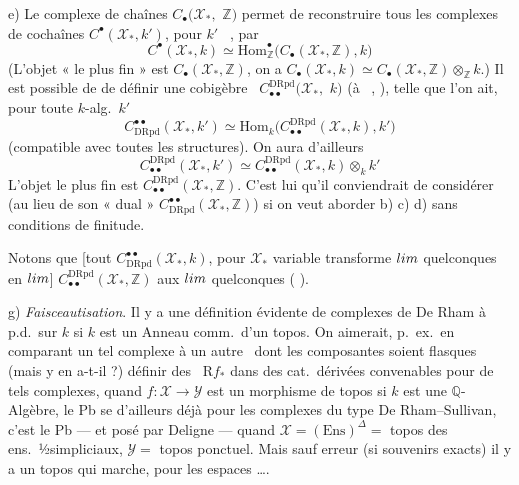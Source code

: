 \documentclass[11pt,a4paper]{article}
\begin{document}
e) Le complexe de chaînes $C_\bullet(\mathcal{X}_*,$  $\mathbb{Z})$ permet de reconstruire tous les complexes de cochaînes $C^\bullet(\mathcal{X}_*, k')$, pour $k'$ \struck{\ill{}} \ , par
\[ C^\bullet(\mathcal{X}_*, k) \simeq \mathrm{Hom}^\bullet_{\mathbb{Z}}\bigl(C_\bullet(\mathcal{X}_*, \mathbb{Z}), k\bigr) \]
(L'objet « le plus fin » est $C_\bullet(\mathcal{X}_*, \mathbb{Z})$, on a $C_\bullet(\mathcal{X}_*, k) \simeq C_\bullet(\mathcal{X}_*, \mathbb{Z}) \otimes_{\mathbb{Z}} k$.) Il est possible de \struck{\ill{}} de définir une cobigèbre \ $C^{\mathrm{DRpd}}_{\bullet\bullet}(\mathcal{X}_*,$  $k)$ (à \ , ), telle que l'on ait, pour toute $k$-alg.\ $k'$
\[ C^{\bullet\bullet}_{\mathrm{DRpd}}(\mathcal{X}_*, k') \simeq \mathrm{Hom}_k\bigl(C^{\mathrm{DRpd}}_{\bullet\bullet}(\mathcal{X}_*, k), k'\bigr) \]
(compatible avec toutes les structures). On aura d'ailleurs
\[ C^{\mathrm{DRpd}}_{\bullet\bullet}(\mathcal{X}_*, k') \simeq C^{\mathrm{DRpd}}_{\bullet\bullet}(\mathcal{X}_*, k) \otimes_k k' \]
L'objet le plus fin est $C^{\mathrm{DRpd}}_{\bullet\bullet}(\mathcal{X}_*, \mathbb{Z})$. C'est lui qu'il conviendrait de considérer (au lieu de son « dual » $C^{\bullet\bullet}_{\mathrm{DRpd}}(\mathcal{X}_*, \mathbb{Z})$) si on veut aborder b) c) d) sans conditions de finitude.

Notons que [tout  $C^{\bullet\bullet}_{\mathrm{DRpd}}(\mathcal{X}_*, k)$, pour $\mathcal{X}_*$ variable transforme $\varinjlim$ quelconques en $\varprojlim$] $C^{\mathrm{DRpd}}_{\bullet\bullet}(\mathcal{X}_*, \mathbb{Z})$   aux $\varinjlim$ quelconques (  ).

 g) \emph{Faisceautisation}. Il y a une définition évidente de complexes de De Rham à p.d.\ sur $k$ si $k$ est un Anneau comm.\ d'un topos. On aimerait, p.\ ex.\ en comparant un tel complexe à un autre \ dont les composantes soient flasques (mais y en a-t-il  ?) définir des \ $\mathrm{R}f_*$ dans des cat.\ dérivées convenables pour de tels complexes, quand $f \colon \mathcal{X} \to \mathcal{Y}$ est un morphisme de topos  si $k$ est une $\mathbb{Q}$-Algèbre, le  Pb se  d'ailleurs déjà pour les complexes du type De Rham–Sullivan, c'est le Pb  — et posé par Deligne — quand $\mathcal{X} = (\mathrm{Ens})^\Delta =$ topos des ens.\ ½simpliciaux, $\mathcal{Y} =$ topos ponctuel. Mais sauf erreur (si souvenirs  exacts) il y a un topos qui marche, pour les espaces  ….
\end{document}
